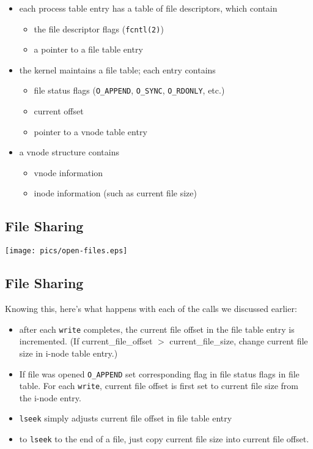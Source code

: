 \documentclass[xga]{xdvislides}
\begin{document}
\begin{itemize}
	\item each process table entry has a table of file descriptors, which
		contain
		\begin{itemize}
			\item the file descriptor flags (\verb+fcntl(2)+)
			\item a pointer to a file table entry
		\end{itemize}
	\item the kernel maintains a file table;  each entry contains
		\begin{itemize}
			\item file status flags (\verb+O_APPEND+, \verb+O_SYNC+, \verb+O_RDONLY+, etc.)
			\item current offset
			\item pointer to a vnode table entry
		\end{itemize}
	\item a vnode structure contains
		\begin{itemize}
			\item vnode information
			\item inode information (such as current file size)
		\end{itemize}
\end{itemize}

\subsection{File Sharing}
\begin{center}
\texttt{[image: pics/open-files.eps]} \\
\end{center}

\subsection{File Sharing}
Knowing this, here's what happens with each of the calls we discussed earlier:

\begin{itemize}
	\item after each {\tt write} completes, the current file offset in the
		file table entry is incremented.  (If current\_file\_offset $>$
		current\_file\_size, change current file size in i-node table entry.)
	\item If file was opened {\tt O\_APPEND} set corresponding flag in file status
		flags in file table. For each {\tt write}, current file offset is first set to
		current file size from the i-node entry.
	\item {\tt lseek} simply adjusts current file offset in file table entry
	\item to {\tt lseek} to the end of a file, just copy current file size into
		current file offset.
\end{itemize}
\end{document}
